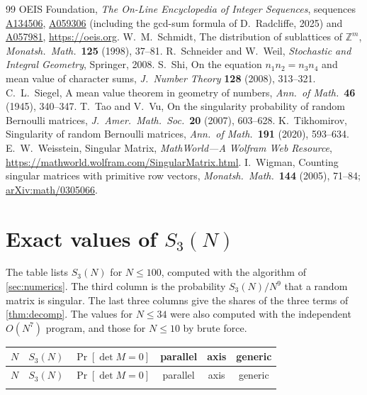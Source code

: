 \documentclass[11pt]{article}
\theoremstyle{definition}
\begin{document}
\begin{thebibliography}{99}
 OEIS Foundation, \emph{The On-Line Encyclopedia of Integer Sequences}, sequences \href{https://oeis.org/A134506}{A134506}, \href{https://oeis.org/A059306}{A059306} (including the gcd-sum formula of D.~Radcliffe, 2025) and \href{https://oeis.org/A057981}{A057981}, \url{https://oeis.org}.
 W.~M.~Schmidt, The distribution of sublattices of $\mathbb{Z}^m$, \emph{Monatsh.\ Math.}\ \textbf{125} (1998), 37--81.
 R.~Schneider and W.~Weil, \emph{Stochastic and Integral Geometry}, Springer, 2008.
 S.~Shi, On the equation $n_1n_2=n_3n_4$ and mean value of character sums, \emph{J.\ Number Theory} \textbf{128} (2008), 313--321.
 C.~L.~Siegel, A mean value theorem in geometry of numbers, \emph{Ann.\ of Math.}\ \textbf{46} (1945), 340--347.
 T.~Tao and V.~Vu, On the singularity probability of random Bernoulli matrices, \emph{J.\ Amer.\ Math.\ Soc.}\ \textbf{20} (2007), 603--628.
 K.~Tikhomirov, Singularity of random Bernoulli matrices, \emph{Ann.\ of Math.}\ \textbf{191} (2020), 593--634.
 E.~W.~Weisstein, Singular Matrix, \emph{MathWorld---A Wolfram Web Resource}, \url{https://mathworld.wolfram.com/SingularMatrix.html}.
 I.~Wigman, Counting singular matrices with primitive row vectors, \emph{Monatsh.\ Math.}\ \textbf{144} (2005), 71--84; \href{https://arxiv.org/abs/math/0305066}{arXiv:math/0305066}.
\end{thebibliography}

\appendix
\section{Exact values of \texorpdfstring{$S_3(N)$}{S3(N)}}\label{app:table}

The table lists $S_3(N)$ for $N\le100$, computed with the algorithm of \cref{sec:numerics}. The third column is the probability $S_3(N)/N^9$ that a random matrix is singular. The last three columns give the shares of the three terms of \cref{thm:decomp}. The values for $N\le34$ were also computed with the independent $O(N^7)$ program, and those for $N\le10$ by brute force.

{\small
\setlength{\LTpre}{6pt}\setlength{\LTpost}{0pt}
\begin{longtable}{@{}rrcccc@{}}
\toprule
$N$ & $S_3(N)$ & $\Pr[\det M=0]$ & parallel & axis & generic\\
\midrule
\endfirsthead
\toprule
$N$ & $S_3(N)$ & $\Pr[\det M=0]$ & parallel & axis & generic\\
\midrule
\endhead
\bottomrule
\endfoot

\end{longtable}
}
\end{document}

